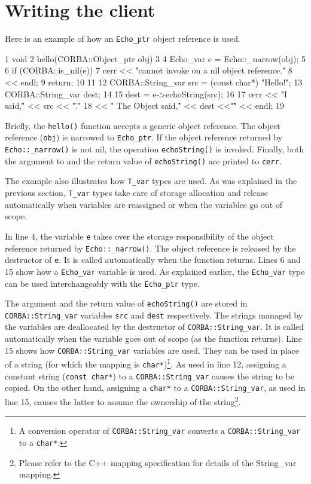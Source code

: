 \documentclass[11pt,twoside,a4paper]{book}
\newcommand{\type}[1]{\texttt{#1}}
\newcommand{\code}[1]{\texttt{#1}}
\newcommand{\op}[1]{\texttt{#1()}}
\newcommand{\dsc}{\discretionary{}{}{}}
\begin{document}
\section{Writing the client}

Here is an example of how an \type{Echo\_ptr} object reference is
used.

\lstset{labelstep=1,gobble=4}
\begin{cxxlisting}
 1  void
 2  hello(CORBA::Object_ptr obj)
 3  {
 4    Echo_var e = Echo::_narrow(obj);
 5
 6    if (CORBA::is_nil(e)) {
 7      cerr << "cannot invoke on a nil object reference."
 8           << endl;
 9      return;
10    }
11
12    CORBA::String_var src = (const char*) "Hello!";
13    CORBA::String_var dest;
14
15    dest = e->echoString(src);
16
17    cerr << "I said,\"" << src << "\"."
18         << " The Object said,\"" << dest <<"\"" << endl;
19  }
\end{cxxlisting}
\lstset{labelstep=0,gobble=0}

Briefly, the \op{hello} function accepts a generic object reference.
The object reference (\code{obj}) is narrowed to \type{Echo\_ptr}. If
the object reference returned by \op{Echo::\_narrow} is not nil, the
operation \op{echoString} is invoked. Finally, both the argument to
and the return value of \op{echoString} are printed to \code{cerr}.

The example also illustrates how \type{T\_var} types are used. As was
explained in the previous section, \type{T\_var} types take care of
storage allocation and release automatically when variables are
reassigned or when the variables go out of scope.

In line 4, the variable \code{e} takes over the storage responsibility
of the object reference returned by \op{Echo::\_narrow}. The object
reference is released by the destructor of \code{e}. It is called
automatically when the function returns. Lines 6 and 15 show how a
\type{Echo\_var} variable is used. As explained earlier, the
\type{Echo\_var} type can be used interchangeably with the
\type{Echo\_ptr} type.

The argument and the return value of \op{echoString} are stored in
\type{CORBA::\dsc{}String\_var} variables \code{src} and \code{dest}
respectively. The strings managed by the variables are deallocated by
the destructor of \type{CORBA::String\_var}. It is called
automatically when the variable goes out of scope (as the function
returns). Line 15 shows how \type{CORBA::String\_var} variables are
used. They can be used in place of a string (for which the mapping is
\type{char*})\footnote{A conversion operator of
\type{CORBA::String\_var} converts a \type{CORBA::\dsc{}String\_var}
to a \type{char*}.}. As used in line 12, assigning a constant string
(\type{const char*}) to a \type{CORBA::String\_var} causes the string
to be copied. On the other hand, assigning a \type{char*} to a
\type{CORBA::String\_var}, as used in line 15, causes the latter to
assume the ownership of the string\footnote{Please refer to the C++
mapping specification for details of the String\_var mapping.}.
\end{document}
